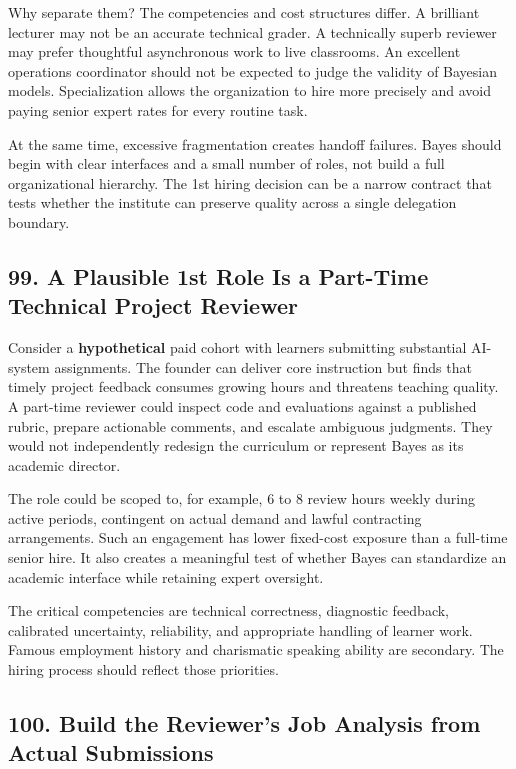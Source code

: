 Why separate them? The competencies and cost structures differ. A brilliant lecturer may not be an accurate technical grader. A technically superb reviewer may prefer thoughtful asynchronous work to live classrooms. An excellent operations coordinator should not be expected to judge the validity of Bayesian models. Specialization allows the organization to hire more precisely and avoid paying senior expert rates for every routine task.

At the same time, excessive fragmentation creates handoff failures. Bayes should begin with clear interfaces and a small number of roles, not build a full organizational hierarchy. The 1st hiring decision can be a narrow contract that tests whether the institute can preserve quality across a single delegation boundary.

\subsection*{99. A Plausible 1st Role Is a Part-Time Technical Project Reviewer}

Consider a \textbf{hypothetical} paid cohort with learners submitting substantial AI-system assignments. The founder can deliver core instruction but finds that timely project feedback consumes growing hours and threatens teaching quality. A part-time reviewer could inspect code and evaluations against a published rubric, prepare actionable comments, and escalate ambiguous judgments. They would not independently redesign the curriculum or represent Bayes as its academic director.

The role could be scoped to, for example, 6 to 8 review hours weekly during active periods, contingent on actual demand and lawful contracting arrangements. Such an engagement has lower fixed-cost exposure than a full-time senior hire. It also creates a meaningful test of whether Bayes can standardize an academic interface while retaining expert oversight.

The critical competencies are technical correctness, diagnostic feedback, calibrated uncertainty, reliability, and appropriate handling of learner work. Famous employment history and charismatic speaking ability are secondary. The hiring process should reflect those priorities.

\subsection*{100. Build the Reviewer's Job Analysis from Actual Submissions}

